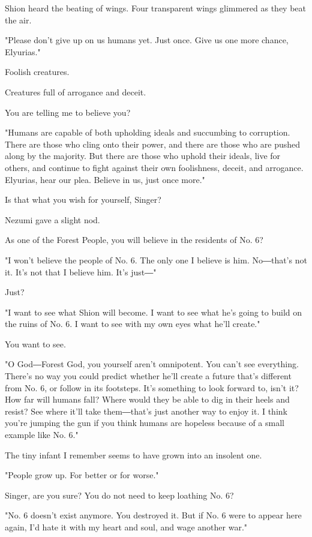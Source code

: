 Shion heard the beating of wings. Four transparent wings glimmered as
they beat the air.

"Please don't give up on us humans yet. Just once. Give us one more
chance, Elyurias."

Foolish creatures.

Creatures full of arrogance and deceit.

You are telling me to believe you?

"Humans are capable of both upholding ideals and succumbing to
corruption. There are those who cling onto their power, and there are
those who are pushed along by the majority. But there are those who
uphold their ideals, live for others, and continue to fight against
their own foolishness, deceit, and arrogance. Elyurias, hear our plea.
Believe in us, just once more."

Is that what you wish for yourself, Singer?

Nezumi gave a slight nod.

As one of the Forest People, you will believe in the residents of No. 6?

"I won't believe the people of No. 6. The only one I believe is him.
No―that's not it. It's not that I believe him. It's just―"

Just?

"I want to see what Shion will become. I want to see what he's going to
build on the ruins of No. 6. I want to see with my own eyes what he'll
create."

You want to see.

"O God―Forest God, you yourself aren't omnipotent. You can't see
everything. There's no way you could predict whether he'll create a
future that's different from No. 6, or follow in its footsteps. It's
something to look forward to, isn't it? How far will humans fall? Where
would they be able to dig in their heels and resist? See where it'll
take them―that's just another way to enjoy it. I think you're jumping
the gun if you think humans are hopeless because of a small example like
No. 6."

The tiny infant I remember seems to have grown into an insolent one.

"People grow up. For better or for worse."

Singer, are you sure? You do not need to keep loathing No. 6?

"No. 6 doesn't exist anymore. You destroyed it. But if No. 6 were to
appear here again, I'd hate it with my heart and soul, and wage another
war."


